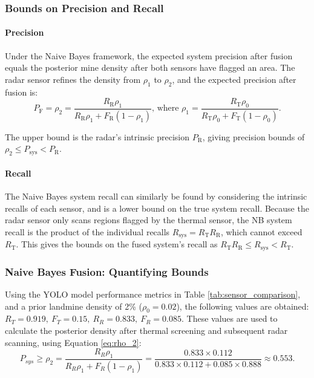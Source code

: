     \subsubsection{Bounds on Precision and Recall}
    
        \paragraph{Precision} Under the Naive Bayes framework, the expected system precision after fusion equals the posterior mine density after both sensors have flagged an area. The radar sensor refines the density from $\rho_1$ to $\rho_2$, and the expected precision after fusion is:
        \begin{equation}
        \label{eq:rho_2}
        P_\text{F} = \rho_\text{2} = \frac{R_\text{R} \rho_\text{1}}{R_\text{R} \rho_\text{1} + F_\text{R} (1-\rho_\text{1})} \text{, where }         \rho_\text{1} = \frac{R_\text{T} \rho_\text{0}}{R_\text{T} \rho_\text{0} + F_\text{T} (1-\rho_\text{0})}.
        \end{equation}
        
         The upper bound is the radar's intrinsic precision $P_\text{R}$, giving precision bounds of $\rho_\text{2} \leq P_\text{sys} < P_\text{R}$.
        
        \paragraph{Recall} The Naive Bayes system recall can similarly be found by considering the intrinsic recalls of each sensor, and is a lower bound on the true system recall. Because the radar sensor only scans regions flagged by the thermal sensor, the NB system recall is the product of the individual recalls \(R_\text{sys} = R_\text{T} R_\text{R}\), 
        which  cannot exceed $R_\text{T}$. This gives the bounds on the fused system's recall as $R_\text{T}R_\text{R}\leq R_\text{sys}< R_\text{T}$.
    
    \subsubsection{Naive Bayes Fusion: Quantifying Bounds}
    
        Using the YOLO model performance metrics in Table \ref{tab:sensor_comparison}, and a prior landmine density of 2\% ($\rho_0 = 0.02$), the following values are obtained: $R_T = 0.919,~ F_T = 0.15,~ R_R = 0.833,~ F_R = 0.085.$ These values are used to calculate the posterior density after thermal screening and subsequent radar scanning, using Equation \ref{eq:rho_2}:
        \[
        P_{sys} \geq \rho_2 = \frac{R_R \rho_1}{R_R \rho_1 + F_R (1-\rho_1)} = \frac{0.833 \times 0.112}{0.833 \times 0.112 + 0.085 \times 0.888} \approx 0.553.
        \]
        
